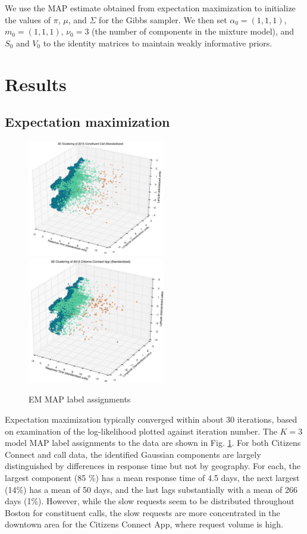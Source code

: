 \documentclass[twoside]{article}
\theoremstyle{theorem}
\theoremstyle{theorem}
\theoremstyle{theorem}
\theoremstyle{lemma}
\theoremstyle{definition}
\theoremstyle{example}
\begin{document}
We use the MAP estimate obtained from expectation maximization to initialize the values of $\pi$, $\mu$, and $\Sigma$ for the Gibbs sampler. We then set $\alpha_0 = (1,1,1)$, $m_0 = (1,1,1)$, $\nu_0 = 3$ (the number of components in the mixture model), and $S_0$ and $V_0$ to the identity matrices to maintain weakly informative priors.   

\section{Results}

\subsection{Expectation maximization}
\begin{figure}
\begin{center}
\includegraphics[width=60mm]{3D_call}
\includegraphics[width=60mm]{3D_app}
\caption{EM MAP label assignments}
\label{EMlabels}
\end{center}
\end{figure}

Expectation maximization typically converged within about 30 iterations, based on examination of the log-likelihood plotted against iteration number. The $K=3$ model MAP label assignments to the data are shown in Fig. \ref{EMlabels}. For both Citizens Connect and call data, the identified Gaussian components are largely distinguished by differences in response time but not by geography. For each, the largest component (85 \%) has a mean response time of 4.5 days, the next largest (14\%) has a mean of 50 days, and the last lags substantially with a mean of 266 days (1\%). However, while the slow requests seem to be distributed throughout Boston for constituent calls, the slow requests are more concentrated in the downtown area for the Citizens Connect App, where request volume is high.
\end{document}
